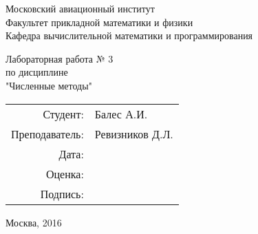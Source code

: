 \thispagestyle{empty}

\begin{center}
Московский авиационный институт\\
\vspace{0.5cm}
Факультет прикладной математики и физики\\
\vspace{0.5cm}
Кафедра вычислительной математики и программирования\\

\vspace{3cm}

Лабораторная работа № 3\\
по дисциплине\\
"Численные методы"\\
\end{center}

\vspace{3cm}

\begin{flushright}
\begin{tabular}{rl}
Студент: & Балес А.И.\\
Преподаватель: & Ревизников Д.Л. \\
Дата: & \\
Оценка: & \\
Подпись: & \\
\end{tabular}
\end{flushright}

\vspace{5cm}

\begin{center}
Москва, 2016
\end{center}

\pagebreak
